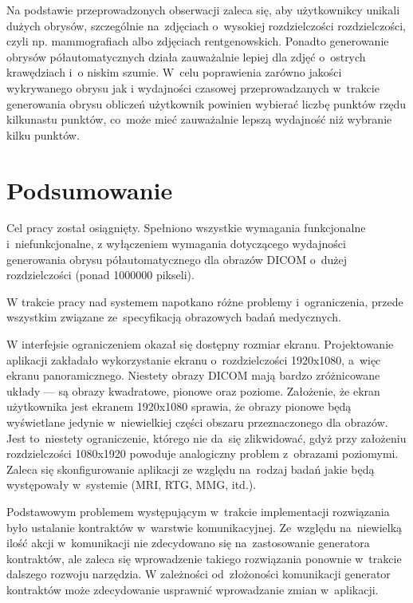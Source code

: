 \documentclass[a4paper,11pt,twoside,openright]{report}
\newcommand\blankpage{%
    \null
    \thispagestyle{empty}%
    \newpage}
\theoremstyle{definition}
\begin{document}
Na podstawie przeprowadzonych obserwacji zaleca się, aby użytkownikcy unikali
dużych obrysów, szczególnie na~zdjęciach o~wysokiej rozdzielczości rozdzielczości,
czyli np. mammografiach albo zdjęciach rentgenowskich. Ponadto generowanie obrysów
półautomatycznych działa zauważalnie lepiej dla zdjęć o~ostrych krawędziach i~o
niskim szumie. W~celu poprawienia zarówno jakości wykrywanego obrysu jak i
wydajności czasowej przeprowadzanych w~trakcie generowania obrysu obliczeń użytkownik
powinien wybierać liczbę punktów rzędu kilkunastu punktów, co~może mieć zauważalnie
lepszą wydajność niż wybranie kilku punktów.

\afterpage{\blankpage}
\chapter {Podsumowanie}


Cel pracy został osiągnięty. Spełniono wszystkie wymagania funkcjonalne i~niefunkcjonalne,
z wyłączeniem wymagania dotyczącego wydajności generowania obrysu półautomatycznego
dla obrazów DICOM o~dużej rozdzielczości (ponad 1000000 pikseli).

W trakcie pracy nad systemem napotkano różne problemy i~ograniczenia, przede wszystkim
związane ze~specyfikacją obrazowych badań medycznych.

W interfejsie ograniczeniem okazał się dostępny rozmiar ekranu. Projektowanie
aplikacji zakładało wykorzystanie ekranu o~rozdzielczości 1920x1080, a~więc ekranu
panoramicznego. Niestety obrazy DICOM mają bardzo zróżnicowane układy --- są obrazy
kwadratowe, pionowe oraz poziome. Założenie, że ekran użytkownika jest ekranem
1920x1080 sprawia, że obrazy pionowe będą wyświetlane jedynie w~niewielkiej
części obszaru przeznaczonego dla obrazów. Jest to~niestety ograniczenie, którego
nie da~się zlikwidować, gdyż przy założeniu rozdzielczości 1080x1920 powoduje
analogiczny problem z~obrazami poziomymi. Zaleca się skonfigurowanie aplikacji
ze względu na~rodzaj badań jakie będą występowały w~systemie (MRI, RTG, MMG, itd.).


Podstawowym problemem występującym w~trakcie implementacji rozwiązania było
ustalanie kontraktów w~warstwie komunikacyjnej. Ze~względu na~niewielką ilość
akcji w~komunikacji nie zdecydowano się na~zastosowanie generatora kontraktów,
ale zaleca się wprowadzenie takiego rozwiązania ponownie w~trakcie dalszego rozwoju narzędzia.
W zależności od~złożoności komunikacji generator kontraktów może zdecydowanie
usprawnić wprowadzanie zmian w~aplikacji.
\end{document}
